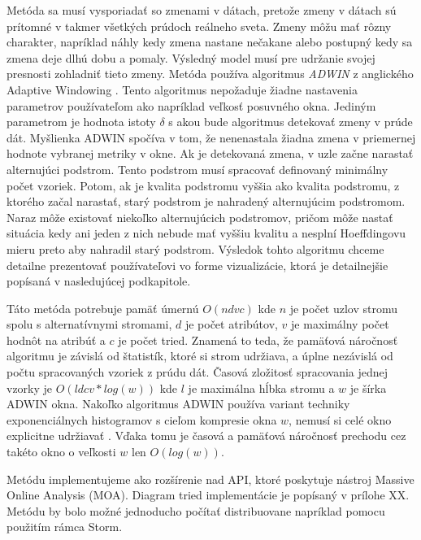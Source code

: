 \par
Metóda sa musí vysporiadať so zmenami v dátach, pretože zmeny v dátach sú prítomné v takmer všetkých prúdoch reálneho sveta. Zmeny môžu mať rôzny charakter, napríklad náhly kedy zmena nastane nečakane alebo postupný kedy sa zmena deje dlhú dobu a pomaly. Výsledný model musí pre udržanie svojej presnosti zohladniť tieto zmeny. Metóda používa algoritmus \textit{ADWIN} z anglického Adaptive Windowing \citep{Hutchison2009}. Tento algoritmus nepožaduje žiadne nastavenia parametrov používateľom ako napríklad veľkosť posuvného okna. Jediným parametrom je hodnota istoty $\delta$ s akou bude algoritmus detekovať zmeny v prúde dát. Myšlienka ADWIN spočíva v tom, že nenenastala žiadna zmena v priemernej hodnote vybranej metriky v okne. Ak je detekovaná zmena, v uzle začne narastať alternujúci podstrom. Tento podstrom musí spracovať definovaný minimálny počet vzoriek. Potom, ak je kvalita podstromu vyššia ako kvalita podstromu, z ktorého začal narastať, starý podstrom je nahradený alternujúcim podstromom. Naraz môže existovať niekoľko alternujúcich podstromov, pričom môže nastať situácia kedy ani jeden z nich nebude mať vyššiu kvalitu a nesplní Hoeffdingovu mieru preto aby nahradil starý podstrom. Výsledok tohto algoritmu chceme detailne prezentovať používateľovi vo forme vizualizácie, ktorá je detailnejšie popísaná v nasledujúcej podkapitole. 
\par
Táto metóda potrebuje pamäť úmernú $O(ndvc)$ kde $n$ je počet uzlov stromu spolu s alternatívnymi stromami, $d$ je počet atribútov, $v$ je maximálny počet hodnôt na atribúť a $c$ je počet tried. Znamená to teda, že pamäťová náročnosť algoritmu je závislá od štatistík, ktoré si strom udržiava, a úplne nezávislá od počtu spracovaných vzoriek z prúdu dát. Časová zložitosť spracovania jednej vzorky je $O(ldcv * log(w))$ kde $l$ je maximálna hĺbka stromu a $w$ je šírka ADWIN okna. Nakoľko algoritmus ADWIN používa variant techniky exponenciálnych histogramov s cieľom kompresie okna $w$, nemusí si celé okno explicitne udržiavať \citep{datar2002maintaining}. Vďaka tomu je časová a pamäťová náročnosť prechodu cez takéto okno o veľkosti $w$ len $O(log(w))$.
\par
Metódu implementujeme ako rozšírenie nad API, ktoré poskytuje nástroj Massive Online Analysis (MOA). Diagram tried implementácie je popísaný v prílohe XX.%
 Metódu by bolo možné jednoducho počítať distribuovane napríklad pomocu použitím rámca Storm.


